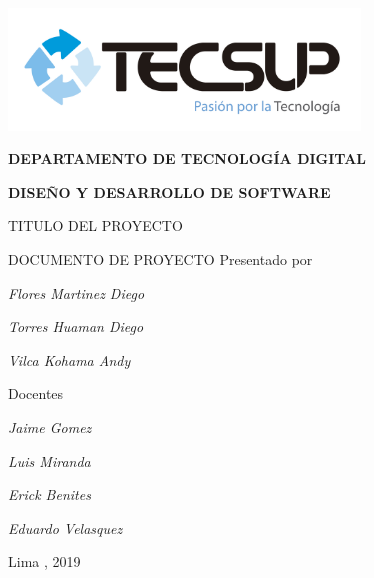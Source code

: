 \begin{titlepage}
	\centering
	\includegraphics[width=0.70\textwidth]{img/logo_tecsup_final}\par\vspace{1cm}
	\vspace{0.30cm}	
	{\scshape\large\bfseries DEPARTAMENTO DE TECNOLOG\'IA DIGITAL \par}
	\vspace{0.60cm}	
	{\scshape\large\bfseries DISEÑO Y DESARROLLO DE SOFTWARE  \par}
	\vspace{2.00cm}		
	{\large\large TITULO DEL PROYECTO \par}
	\vspace{0.60cm}
	{\scshape\large DOCUMENTO DE PROYECTO }
	\vspace{0.60cm}
	\vfill
	Presentado por \par
	{\large\itshape {Flores Martinez Diego}\par}
	{\large\itshape {Torres Huaman Diego}\par}
	{\large\itshape {Vilca Kohama Andy}\par}
	\vspace{0.30cm}
	\vfill
	Docentes \par
	{\large\itshape {Jaime Gomez}}\par
	{\large\itshape {Luis Miranda}}\par
	{\large\itshape {Erick Benites}}\par
	{\large\itshape {Eduardo Velasquez}}\par
  \vspace{0.30cm}
	\vfill
        {\large Lima , 2019 \par}
\end{titlepage}

